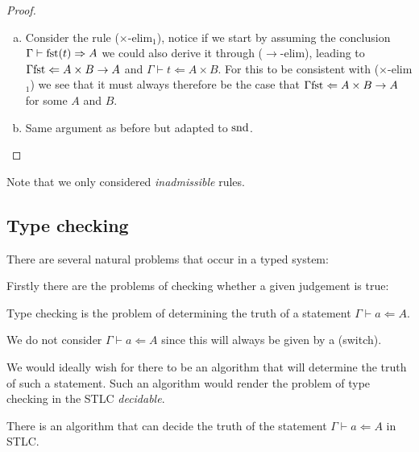 \begin{proof}
\begin{enumerate}[(a)]
        \item Consider the rule ($\times$-elim${}_1$), notice if we start by assuming the conclusion $\Gamma \vdash \mathrm{fst} (t) \Rightarrow A$ we could also derive it through ($\to$-elim), leading to $\Gamma \mathrm{fst} \Leftarrow A \times B \to A$ and $\Gamma \vdash t \Leftarrow A \times B$. For this to be consistent with ($\times$-elim${}_1$) we see that it must always therefore be the case that $\Gamma \mathrm{fst} \Leftarrow A \times B \to A$ for some $A$ and $B$.
        \item Same argument as before but adapted to $\mathrm{snd}$. 
    \end{enumerate}
\end{proof}

\begin{remark}
    Note that we only considered \emph{inadmissible} rules.
\end{remark}

\subsection{Type checking}

There are several natural problems that occur in a typed system:

Firstly there are the problems of checking whether a given judgement is true:

\begin{defin}
    Type checking is the problem of determining the truth of a statement $\Gamma \vdash a \Leftarrow A$.
\end{defin}

\begin{remark}
    We do not consider $\Gamma \vdash a \Leftarrow A$ since this will always be given by a (switch).
\end{remark}

We would ideally wish for there to be an algorithm that will determine the truth of such a statement. Such an algorithm would render the problem of type checking in the STLC \emph{decidable}.

\begin{theorem}
    There is an algorithm that can decide the truth of the statement $\Gamma \vdash a \Leftarrow A$ in STLC.
\end{theorem}

